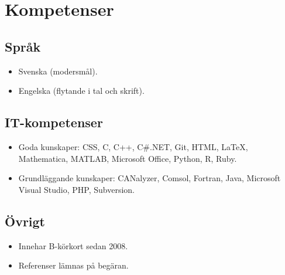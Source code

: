 \documentclass{skvitae}
\begin{document}
	\section{Kompetenser}
	\subsection{Språk}
	\begin{itemize}
		\item Svenska (modersmål).
		\item Engelska (flytande i tal och skrift).
	\end{itemize}

	\medskip
	\subsection{IT-kompetenser}
	\begin{itemize}
		\item Goda kunskaper: CSS, C, C++, C\#.NET, Git, HTML, \LaTeX, Mathematica, MATLAB, Microsoft Office, Python, R, Ruby.
		\item Grundläggande kunskaper: CANalyzer, Comsol, Fortran, Java, Microsoft Visual Studio, PHP, Subversion.
	\end{itemize}

	\medskip
	\subsection{Övrigt}
	\begin{itemize}
		\item Innehar B-körkort sedan 2008.
		\item Referenser lämnas på begäran.
	\end{itemize}
\end{document}

